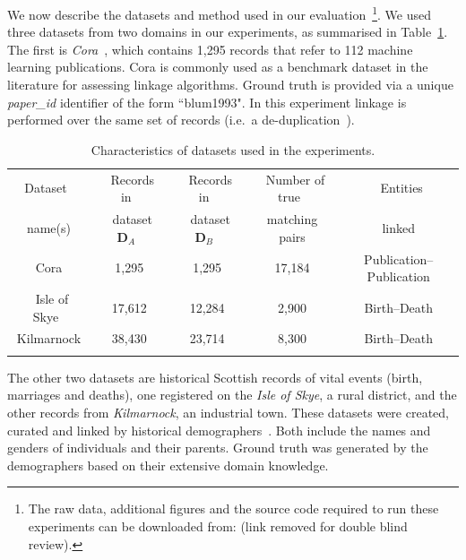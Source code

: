 \documentclass{llncs}
\begin{document}
We now describe the datasets and method used in our evaluation~\footnote{The raw data, additional figures and the source
code required to run these experiments can be downloaded from:
(link removed for double blind review).}.
\label{sec-data}
We used three datasets from two domains in our experiments, as
summarised in Table~\ref{table-datasets}. The first is
\emph{Cora}~\cite{Cora2017}, which contains 1,295 records that refer
to 112 machine learning publications. Cora is commonly used as a
benchmark dataset in the literature for assessing linkage algorithms.
Ground truth is provided via a unique \emph{paper\_id} identifier of
the form ``blum1993". In this experiment linkage is performed over
the same set of records (i.e.\ a de-duplication~\cite{Chr12}).


\begin{table}[t]
\caption{Characteristics of datasets used in the experiments.}
 \label{table-datasets}
  \centering
  \begin{scriptsize}
  \begin{tabular}{ccccc}
  \hline\noalign{\smallskip}
  Dataset~ & ~Records in~& ~Records in~ & ~Number of true~& ~Entities \\
    name(s)  & ~dataset $\mathbf{D}_A$~ & ~dataset $\mathbf{D}_B$~ &
    matching pairs & linked \\
  \noalign{\smallskip} \hline \noalign{\smallskip}
  Cora & 1,295 & 1,295 & 17,184 & Publication--Publication\\
  ~Isle of Skye~ & 17,612 & 12,284& 2,900 & Birth--Death \\
  Kilmarnock & ~38,430~ & ~23,714~ & ~8,300~ & ~Birth--Death~ \\
  \noalign{\smallskip} \hline
  \end{tabular}
  \end{scriptsize}
\end{table}


The other two datasets are historical Scottish records of vital events
(birth, marriages and deaths), one registered on the \emph{Isle of
Skye}, a rural district, and the other records from
\emph{Kilmarnock}, an industrial town. These datasets were created, curated and linked by
historical demographers~\cite{reid2006,reid2002}. Both include the names and
genders of individuals and their parents. Ground truth was
generated by the demographers based on their extensive domain
knowledge.
\end{document}
